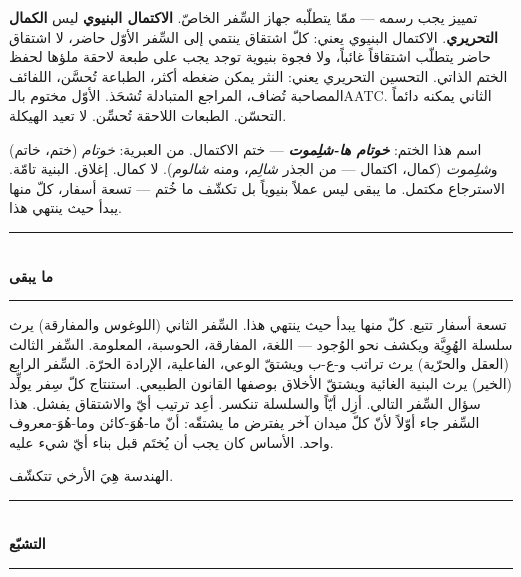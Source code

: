 \documentclass[10pt, openany, oneside]{book}
\renewcommand{\normalsize}{\fontsize{10}{13}\selectfont}
\begin{document}
تمييز يجب رسمه --- ممّا يتطلّبه جهاز السِّفر الخاصّ. \textbf{الاكتمال البنيوي} ليس \textbf{الكمال التحريري}. الاكتمال البنيوي يعني: كلّ اشتقاق ينتمي إلى السِّفر الأوّل حاضر، لا اشتقاق حاضر يتطلّب اشتقاقاً غائباً، ولا فجوة بنيوية توجد يجب على طبعة لاحقة ملؤها لحفظ الختم الذاتي. التحسين التحريري يعني: النثر يمكن ضغطه أكثر، الطباعة تُحسَّن، اللفائف المصاحبة تُضاف، المراجع المتبادلة تُشحَذ. الأوّل مختوم بالـAATC. الثاني يمكنه دائماً التحسّن. الطبعات اللاحقة تُحسِّن. لا تعيد الهيكلة.

اسم هذا الختم: \textbf{\textit{خوتام ها-شلِموت}} --- ختم الاكتمال. من العبرية: \textit{خوتام} (ختم، خاتم) و\textit{شلِموت} (كمال، اكتمال --- من الجذر \textit{شالِم}، ومنه \textit{شالوم}). لا كمال. إغلاق. البنية تامّة. الاسترجاع مكتمل. ما يبقى ليس عملاً بنيوياً بل تكشّف ما خُتم --- تسعة أسفار، كلّ منها يبدأ حيث ينتهي هذا.

\vspace{1.5em}


\begin{center}
    \rule{0.3\textwidth}{0.4pt}\\[0.5em]
    {\normalsize\bfseries ما يبقى}\\[0.3em]
    \rule{0.3\textwidth}{0.4pt}
\end{center}

\vspace{1em}

\noindent تسعة أسفار تتبع. كلّ منها يبدأ حيث ينتهي هذا. السِّفر الثاني (اللوغوس والمفارقة) يرث سلسلة الهُوِيَّة ويكشف نحو الوُجود --- اللغة، المفارقة، الحوسبة، المعلومة. السِّفر الثالث (العقل والحرّية) يرث تراتب و-ع-ب ويشتقّ الوعي، الفاعلية، الإرادة الحرّة. السِّفر الرابع (الخير) يرث البنية الغائية ويشتقّ الأخلاق بوصفها القانون الطبيعي. استنتاج كلّ سِفر يولِّد سؤال السِّفر التالي. أزِل أيّاً والسلسلة تنكسر. أعِد ترتيب أيّ والاشتقاق يفشل. هذا السِّفر جاء أوّلاً لأنّ كلّ ميدان آخر يفترض ما يشتقّه: أنّ ما-هُوَ-كائن وما-هُوَ-معروف واحد. الأساس كان يجب أن يُختَم قبل بناء أيّ شيء عليه.

الهندسة هِيَ الأرخي تتكشّف.

\vspace{1.5em}


\begin{center}
    \rule{0.3\textwidth}{0.4pt}\\[0.5em]
    {\normalsize\bfseries التشبّع}\\[0.3em]
    \rule{0.3\textwidth}{0.4pt}
\end{center}
\end{document}

